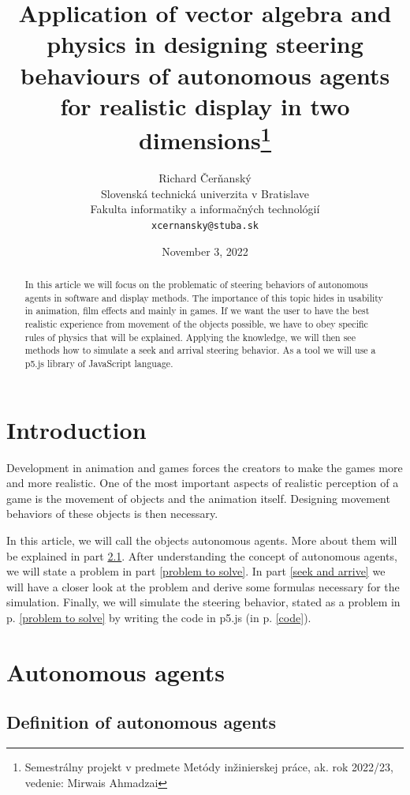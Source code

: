 \documentclass[10pt,twoside,english,a4paper]{article}
\title{Application of vector algebra and physics in designing steering behaviours of autonomous agents for realistic display in two dimensions\thanks{Semestrálny projekt v predmete Metódy inžinierskej práce, ak. rok 2022/23, vedenie: Mirwais Ahmadzai}}
\author{Richard Čerňanský\\[2pt]
	{\small Slovenská technická univerzita v Bratislave}\\
	{\small Fakulta informatiky a informačných technológií}\\
	{\small \texttt{xcernansky@stuba.sk}}
	}
\date{\small November 3, 2022 }
\begin{document}
\maketitle

\begin{abstract}

In this article we will focus on the problematic of steering behaviors of autonomous agents in software and display methods. The importance of this topic hides in usability in animation, film effects and mainly in games. If we want the user to have the best realistic experience from movement of the objects possible, we have to obey specific rules of physics that will be explained. Applying the knowledge, we will then see methods how to simulate a seek and arrival steering behavior. As a tool we will use a p5.js library of JavaScript language.

\end{abstract}

\section{Introduction}

Development in animation and games forces the creators to make the games more and more realistic. One of the most important aspects of realistic perception of a game is the movement of objects and the animation itself. Designing movement behaviors of these objects is then necessary. 

In this article, we will call the objects autonomous agents. More about them will be explained in part \ref{definition of a.a.}. After understanding the concept of autonomous agents, we will state a problem in part \ref{problem to solve}. In part \ref{seek and arrive} we will have a closer look at the problem and derive some formulas necessary for the simulation. Finally, we will simulate the steering behavior, stated as a problem in p. \ref{problem to solve} by writing the code in p5.js (in p. \ref{code}).

\section{Autonomous agents} \label{autonomous agents}

\subsection{Definition of autonomous agents} \label{definition of a.a.}
\end{document}
